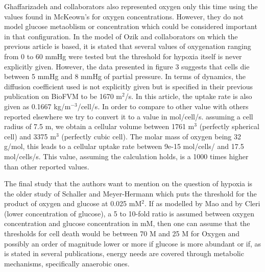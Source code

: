 \documentclass[11pt,a4paper]{article}
\begin{document}
Ghaffarizadeh and collaborators also represented oxygen only this time using the values found in McKeown's for oxygen concentrations.\cite{McKeown2014} However, they do not model glucose metaoblism or concentration which could be considered important in that configuration. In the model of Ozik and collaborators on which the previous article is based, it is stated that several values of oxygenation ranging from 0 to 60 mmHg were tested but the threshold for hypoxia itself is never explicitly given.\cite{Ozik2018} However, the data presented in figure 3 suggests that cells die between 5 mmHg and 8 mmHg of partial pressure. In terms of dynamics, the diffusion coefficient used is not explicitly given but is specified in their previous publication on BioFVM to be 1670 \textmu m$^2$/s. \cite{Ghaffarizadeh2015} In this article, the uptake rate is also given as 0.1667 kg/m$^{-3}$/cell/s. In order to compare to other value with others reported elsewhere we try to convert it to a value in mol/cell/s. assuming a cell radius of 7.5 \textmu m, we obtain a cellular volume between 1761 \textmu m$^3$ (perfectly spherical cell) and 3375 \textmu m$^3$ (perfectly cubic cell). The molar mass of oxygen being 32 g/mol, this leads to a cellular uptake rate between 9e-15 mol/cells/ and 17.5 mol/cells/s. This value, assuming the calculation holds, is a 1000 times higher than other reported values. 


% 

The final study that the authors want to mention on the question of hypoxia is the older study of Schaller and Meyer-Hermann which puts the threshold for the product of oxygen and glucose at 0.025 mM$^2$. If as modelled by Mao and by Cleri (lower concentration of glucose), a 5 to 10-fold ratio is assumed between oxygen concentration and glucose concentration in mM, then one can assume that the thresholds for cell death would be between 70 \textmu M and 25 \textmu M for Oxygen and possibly an order of magnitude lower or more if glucose is more abundant or if, as is stated in several publications, energy needs are covered through metabolic mechanisms, specifically anaerobic ones. 
\end{document}
